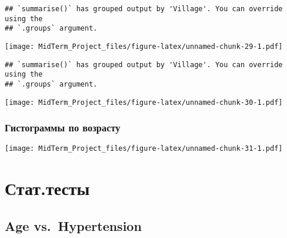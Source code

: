 \documentclass[
]{article}
\newenvironment{Shaded}{\begin{snugshade}}{\end{snugshade}}
\newcommand{\CommentTok}[1]{\textcolor[rgb]{0.56,0.35,0.01}{\textit{#1}}}
\newcommand{\FunctionTok}[1]{\textcolor[rgb]{0.13,0.29,0.53}{\textbf{#1}}}
\newcommand{\NormalTok}[1]{#1}
\newcommand{\OtherTok}[1]{\textcolor[rgb]{0.56,0.35,0.01}{#1}}
\newcommand{\SpecialCharTok}[1]{\textcolor[rgb]{0.81,0.36,0.00}{\textbf{#1}}}
\newcommand{\StringTok}[1]{\textcolor[rgb]{0.31,0.60,0.02}{#1}}
\begin{document}
\begin{verbatim}
## `summarise()` has grouped output by 'Village'. You can override using the
## `.groups` argument.
\end{verbatim}

\texttt{[image: MidTerm\_Project\_files/figure-latex/unnamed-chunk-29-1.pdf]}

\begin{verbatim}
## `summarise()` has grouped output by 'Village'. You can override using the
## `.groups` argument.
\end{verbatim}

\texttt{[image: MidTerm\_Project\_files/figure-latex/unnamed-chunk-30-1.pdf]}

\subsubsection{Гистограммы по
возрасту}\label{ux433ux438ux441ux442ux43eux433ux440ux430ux43cux43cux44b-ux43fux43e-ux432ux43eux437ux440ux430ux441ux442ux443}

\texttt{[image: MidTerm\_Project\_files/figure-latex/unnamed-chunk-31-1.pdf]}

\section{Стат.тесты}\label{ux441ux442ux430ux442.ux442ux435ux441ux442ux44b}

\subsection{Age vs.~Hypertension}\label{age-vs.-hypertension}

\begin{Shaded}
\end{Shaded}
\end{document}
